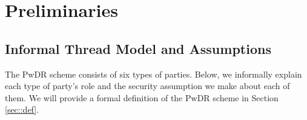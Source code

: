 






\section{Preliminaries} \label{preliminaries}


\subsection{Informal Thread Model and Assumptions}\label{Notations-and-Assumptions}

The PwDR scheme consists of six types of parties. Below, we informally explain each type of party's role and the security assumption we make about each of them. We will provide a formal definition of the  PwDR scheme in Section \ref{sec::def}. 
%

